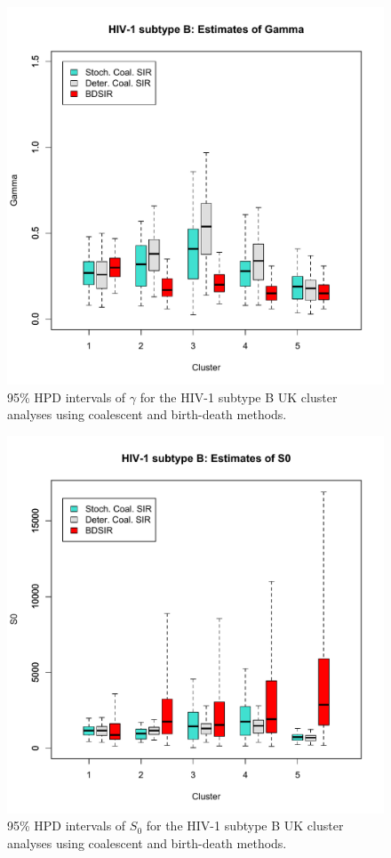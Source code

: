 \documentclass[12pt,titlepage]{article}
\begin{document}
%
\begin{figure}[!ht]
\begin{center}
\includegraphics[width=7in]{HIV1subtypeB_gamma.pdf}
\end{center}
\caption{
95\% HPD intervals of $\gamma$ for the HIV-1 subtype B UK cluster 
analyses using coalescent and birth-death methods.}
\label{fig:HIV_gamma}
\end{figure}
%
\begin{figure}[!ht]
\begin{center}
\includegraphics[width=7in]{HIV1subtypeB_S0.pdf}
\end{center}
\caption{95\% HPD intervals of $S_0$ for the HIV-1 subtype B UK cluster 
analyses using coalescent and birth-death methods.}
\label{fig:HIV_S0}
\end{figure}
\end{document}
